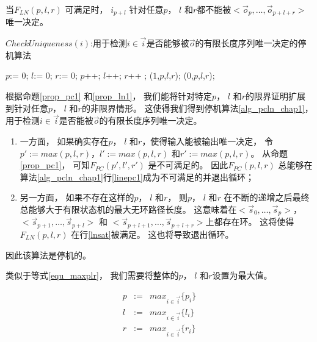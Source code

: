 \begin{proposition}\label{prop_ln1}
当$F_{LN}(p,l,r)$ 可满足时，
$i_{p+l}$ 针对任意$p$， $l$ 和$r$都不能被$<\vec{o}_{p},\dots,\vec{o}_{p+l+r}>$ 唯一决定。
\end{proposition}



\begin{algorithm}[t]
\caption{$CheckUniqueness(i)$:用于检测$i\in\vec{i}$是否能够被$\vec{o}$的有限长度序列唯一决定的停机算法}
\label{alg_pcln_chap1}
\begin{algorithmic}[1]
\STATE $p$:= 0;
\STATE $l$:= 0;
\STATE $r$:= 0;
\STATE $p$++;
\STATE $l$++;
\STATE $r$++ ;
\label{linepc1}
\RETURN ($1$,$p$,$l$,$r$)\label{lineln1};
\label{lnsat}
\RETURN ($0$,$p$,$l$,$r$);
\ENDIF
\ENDWHILE
\end{algorithmic}
\end{algorithm}

%




根据命题\ref{prop_pc1} 和\ref{prop_ln1}，
我们能将针对特定$p$， $l$ 和$r$的限界证明扩展到针对任意$p$， $l$ 和$r$的非限界情形。
这使得我们得到停机算法\ref{alg_pcln_chap1}，
用于检测$i\in\vec{i}$是否能被$\vec{o}$的有限长度序列唯一决定。
\begin{enumerate}
 \item
一方面，
如果确实存在$p$， $l$ 和$r$，使得输入能被输出唯一决定，
令$p':=max(p,l,r)$，$l':=max(p,l,r)$ 和$r':=max(p,l,r)$。
从命题\ref{prop_pc1}，
可知$F_{PC}(p',l',r')$ 是不可满足的。
因此$F_{PC}(p,l,r)$ 总能够在算法\ref{alg_pcln_chap1}行\ref{linepc1}成为不可满足的并退出循环；
 \item
另一方面，
如果不存在这样的$p$， $l$ 和$r$，
则$p$， $l$ 和$r$ 在不断的递增之后最终总能够大于有限状态机的最大无环路径长度。
这意味着在$<\vec{s}_{0},\dots,\vec{s}_{p}>$，$<\vec{s}_{p+1},\dots,\vec{s}_{p+l}>$ 和
$<\vec{s}_{p+l+1},\dots,\vec{s}_{p+l+r}>$上都存在环。
这将使得$F_{LN}(p,l,r)$ 在行\ref{lnsat}被满足。
这也将导致退出循环。
\end{enumerate}


因此该算法是停机的。

类似于等式{\ref{equ_maxplr}}，
我们需要将整体的$p$， $l$ 和$r$设置为最大值。

\begin{equation}\label{equ_maxplr_ln}
\begin{array}{ccc}
p & :=  & max_{i\in\vec{i}} \{p_i\}\\
l & :=  & max_{i\in\vec{i}} \{l_i\}\\
r & :=  & max_{i\in\vec{i}} \{r_i\}
\end{array}
\end{equation}

